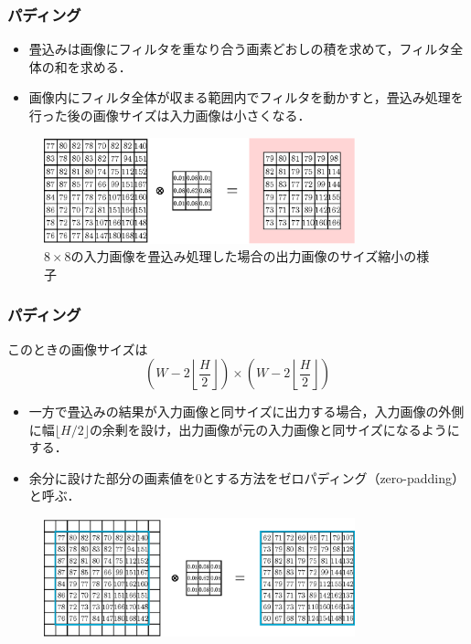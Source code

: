 \documentclass[dvipdfmx,11pt,notheorems]{beamer}
\theoremstyle{definition}
\begin{document}
\begin{frame}[fragile]\frametitle{パディング}
\begin{itemize}
\item 畳込みは画像にフィルタを重なり合う画素どおしの積を求めて，フィルタ全体の和を求める．
\item 画像内にフィルタ全体が収まる範囲内でフィルタを動かすと，畳込み処理を行った後の画像サイズは入力画像は小さくなる．
\end{itemize}

\begin{figure}[b]
  \begin{center}
    \includegraphics[clip,width=9cm]{fig/eps/convolution.eps}
  \end{center}
  \caption{$8\times 8$の入力画像を畳込み処理した場合の出力画像のサイズ縮小の様子}
  \label{fig:88の入力画像を畳込み処理した場合の出力画像のサイズ縮小の様子}
\end{figure}

\end{frame}

\begin{frame}[fragile]\frametitle{パディング}
\begin{block}{このときの画像サイズは}
\begin{equation}
  \left(W-2\left\lfloor \frac{H}{2}\right\rfloor\right)\times \left(W-2\left\lfloor \frac{H}{2}\right\rfloor\right)
\end{equation}
\end{block}
\begin{itemize}
\item 一方で畳込みの結果が入力画像と同サイズに出力する場合，入力画像の外側に幅$\lfloor H/2\rfloor$の余剰を設け，出力画像が元の入力画像と同サイズになるようにする．
\item 余分に設けた部分の画素値を0とする方法をゼロパディング（zero-padding）と呼ぶ．
\end{itemize}

\begin{figure}[t]
  \begin{center}
    \includegraphics[clip,width=9cm]{fig/eps/zero_padding.eps}
  \end{center}
\end{figure}
\end{frame}
\end{document}
